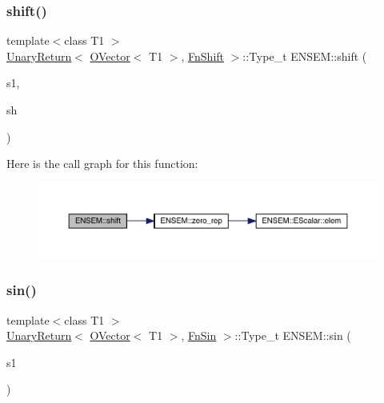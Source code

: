 \subsubsection{\texorpdfstring{shift()}{shift()}}
{\footnotesize\ttfamily template$<$class T1 $>$ \\
\mbox{\hyperlink{structENSEM_1_1UnaryReturn}{Unary\+Return}}$<$ \mbox{\hyperlink{classENSEM_1_1OVector}{O\+Vector}}$<$ T1 $>$, \mbox{\hyperlink{structENSEM_1_1FnShift}{Fn\+Shift}} $>$\+::Type\+\_\+t E\+N\+S\+E\+M\+::shift (\begin{DoxyParamCaption}\item[{const \mbox{\hyperlink{classENSEM_1_1OVector}{O\+Vector}}$<$ T1 $>$ \&}]{s1,  }\item[{int}]{sh }\end{DoxyParamCaption})\hspace{0.3cm}{\ttfamily [inline]}}

Here is the call graph for this function\+:\nopagebreak
\begin{figure}[H]
\begin{center}
\leavevmode
\includegraphics[width=350pt]{da/d59/group__obsvector_ga0f56d530ee90cdb061c1aeff65389a61_cgraph}
\end{center}
\end{figure}
\mbox{\label{group__obsvector_ga3731f97921228d0d2c0ad3d05aa88985}} 
\subsubsection{\texorpdfstring{sin()}{sin()}}
{\footnotesize\ttfamily template$<$class T1 $>$ \\
\mbox{\hyperlink{structENSEM_1_1UnaryReturn}{Unary\+Return}}$<$ \mbox{\hyperlink{classENSEM_1_1OVector}{O\+Vector}}$<$ T1 $>$, \mbox{\hyperlink{structENSEM_1_1FnSin}{Fn\+Sin}} $>$\+::Type\+\_\+t E\+N\+S\+E\+M\+::sin (\begin{DoxyParamCaption}\item[{const \mbox{\hyperlink{classENSEM_1_1OVector}{O\+Vector}}$<$ T1 $>$ \&}]{s1 }\end{DoxyParamCaption})\hspace{0.3cm}{\ttfamily [inline]}}

